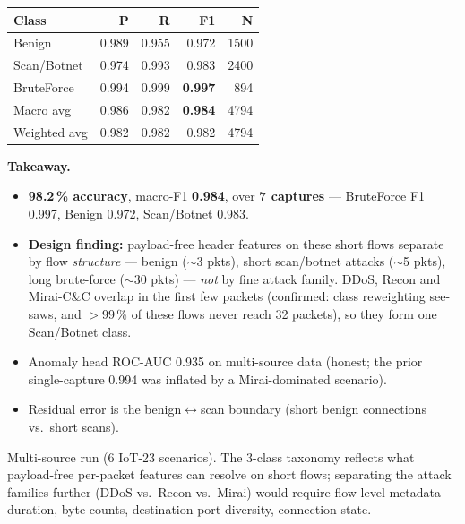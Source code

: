 \documentclass[11pt,a4paper]{article}
\newcommand{\hd}[1]{\textbf{\textcolor{accent}{#1}}}
\begin{document}
\begin{minipage}[t]{0.50\textwidth}
\centering
\small
\renewcommand{\arraystretch}{1.15}
\begin{tabular}{@{}lrrrr@{}}
\toprule
\textbf{Class} & \textbf{P} & \textbf{R} & \textbf{F1} & \textbf{N} \\
\midrule
Benign      & 0.989 & 0.955 & 0.972 & 1500 \\
Scan/Botnet & 0.974 & 0.993 & 0.983 & 2400 \\
BruteForce  & 0.994 & 0.999 & \textbf{0.997} & 894 \\
\midrule
Macro avg    & 0.986 & 0.982 & \textbf{0.984} & 4794 \\
Weighted avg & 0.982 & 0.982 & 0.982 & 4794 \\
\bottomrule
\end{tabular}

\vspace{8pt}
\raggedright
{\small
\hd{Takeaway.}
\begin{itemize}[leftmargin=1.1em, itemsep=1pt, topsep=2pt]
  \item \textbf{98.2\,\% accuracy}, macro-F1 \textbf{0.984}, over \textbf{7 captures} --- BruteForce F1 0.997, Benign 0.972, Scan/Botnet 0.983.
  \item \hd{Design finding:} payload-free header features on these short flows separate by flow \emph{structure} --- benign ($\sim$3 pkts), short scan/botnet attacks ($\sim$5 pkts), long brute-force ($\sim$30 pkts) --- \emph{not} by fine attack family. DDoS, Recon and Mirai-C\&C overlap in the first few packets (confirmed: class reweighting see-saws, and $>$99\,\% of these flows never reach 32 packets), so they form one Scan/Botnet class.
  \item Anomaly head ROC-AUC 0.935 on multi-source data (honest; the prior single-capture 0.994 was inflated by a Mirai-dominated scenario).
  \item Residual error is the benign$\leftrightarrow$scan boundary (short benign connections vs.\ short scans).
\end{itemize}}
\end{minipage}

\vspace{4pt}
\noindent\textcolor{neutral}{\footnotesize Multi-source run (6 IoT-23 scenarios). The 3-class taxonomy reflects what payload-free per-packet features can resolve on short flows; separating the attack families further (DDoS vs.\ Recon vs.\ Mirai) would require flow-level metadata --- duration, byte counts, destination-port diversity, connection state.}
\end{document}
